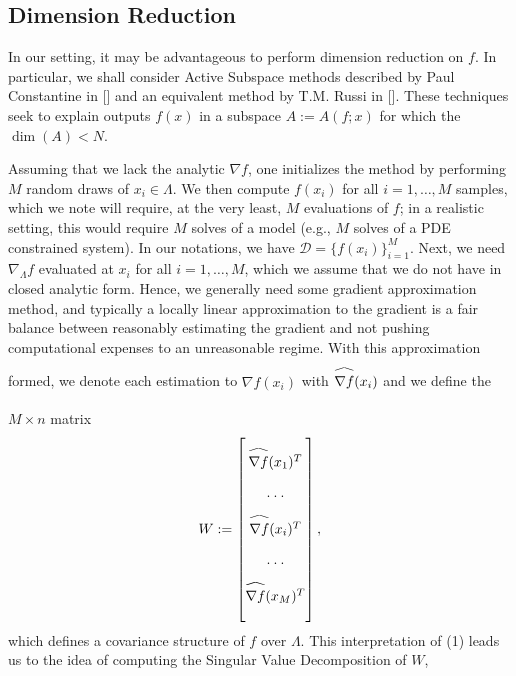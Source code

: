 \documentclass{report}
\newcommand\reallywidehat[1]{\arraycolsep=0pt\relax%
\begin{array}{c}
\stretchto{
  \scaleto{
    \scalerel*[\widthof{\ensuremath{#1}}]{\kern-.5pt\bigwedge\kern-.5pt}
    {\rule[-\textheight/2]{1ex}{\textheight}} %
  }{\textheight} %
}{0.5ex}\\           %
#1\\                 %
\rule{-1ex}{0ex}
\end{array}
}
\begin{document}
\subsection{Dimension Reduction}

In our setting, it may be advantageous to perform dimension reduction on $f$. In particular, we shall consider Active Subspace methods described by Paul Constantine in [] and an equivalent method by T.M. Russi in []. These techniques seek to explain outputs $f(x)$ in a subspace $A:=A(f;x)$ for which the $\dim (A) <N$. 

\vspace{.25cm}

\noindent Assuming that we lack the analytic $\nabla f$, one initializes the method by performing $M$ random draws of $x_i \in \Lambda$. We then compute $f(x_i)$ for all $i=1,\ldots,M$ samples, which we note will require, at the very least, $M$ evaluations of $f$; in a realistic setting, this would require $M$ solves of a model (e.g., $M$ solves of a PDE constrained system). In our notations, we have $\mathcal{D}=\{f(x_i)\}_{i=1}^M$. Next, we need $\nabla_\Lambda f$ evaluated at $x_i$ for all $i=1,\ldots,M$, which we assume that we do not have in closed analytic form. Hence, we generally need some gradient approximation method, and typically a locally linear approximation to the gradient is a fair balance between reasonably estimating the gradient and not pushing computational expenses to an unreasonable regime. With this approximation formed, we denote each estimation to $\nabla f(x_i)$ with $\reallywidehat{\nabla f}(x_i)$ and we define the $M \times n$ matrix
\begin{eqnarray}
W:=\begin{bmatrix}
\reallywidehat{\nabla f}(x_1)^T\\
\cdot \cdot \cdot\\
\reallywidehat{\nabla f}(x_i)^T\\
\cdot \cdot \cdot \\
\reallywidehat{\nabla f}(x_M)^T\\
\end{bmatrix},
\end{eqnarray} which defines a covariance structure of $f$ over $\Lambda$. This interpretation of (1) leads us to the idea of computing the Singular Value Decomposition of $W$,
\end{document}
